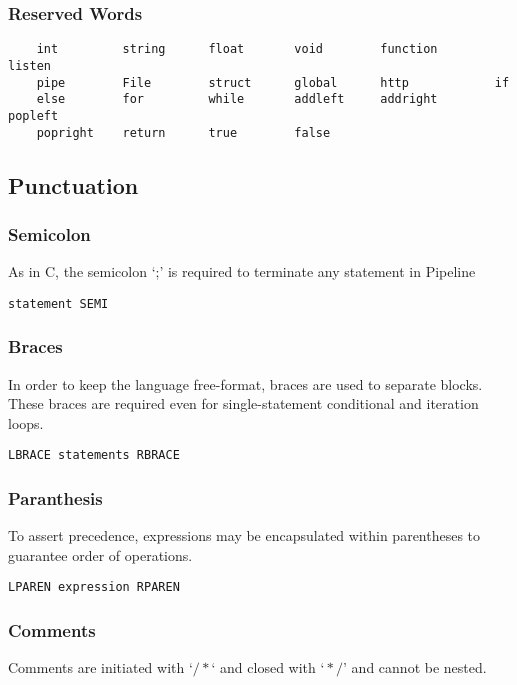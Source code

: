 \documentclass[./LRM_main.tex]{subfiles}
\begin{document}
\subsubsection{Reserved Words}
\begin{lstlisting}
	int         string      float		void		function        listen
    pipe        File        struct      global      http            if
    else        for         while       addleft     addright        popleft
    popright    return      true        false
\end{lstlisting}
\subsection{Punctuation}
\subsubsection{Semicolon}
As in C, the semicolon ‘;’ is required to terminate any statement in Pipeline
\begin{lstlisting}
statement SEMI
\end{lstlisting}

\subsubsection{Braces}
In order to keep the language free-format, braces are used to separate blocks. These braces are required even for single-statement conditional and iteration loops. 
\begin{lstlisting}
LBRACE statements RBRACE
\end{lstlisting}

\subsubsection{Paranthesis}
To assert precedence, expressions may be encapsulated within parentheses to guarantee order of operations.
\begin{lstlisting}
LPAREN expression RPAREN
\end{lstlisting}

\subsubsection{Comments }
Comments are initiated with $‘/* ‘$ and closed with $‘*/’$ and cannot be nested.


\end{document}
